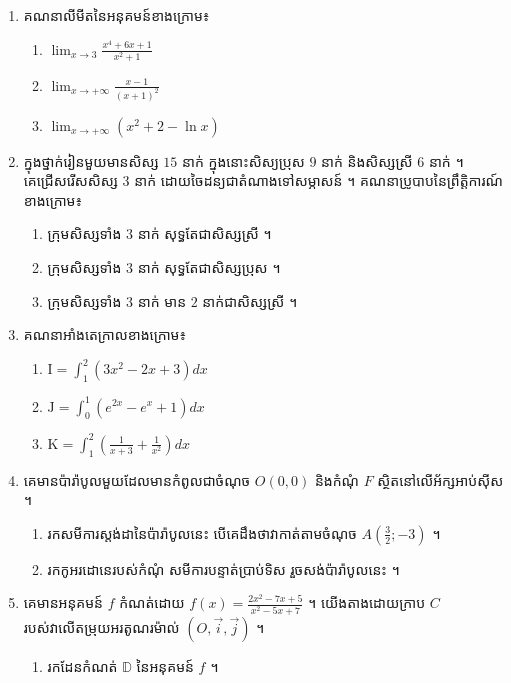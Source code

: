 \documentclass{officialexam}
\begin{document}
  \begin{enumerate}[I]
  	\item គណនាលីមីតនៃអនុគមន៍ខាងក្រោម៖
  	\begin{enumerate}[k,3]
  		\item $\lim_{x\to3}\frac{x^4+6x+1}{x^2+1}$
  		\item $\lim_{x\to+\infty}\frac{x-1}{\left(x+1\right)^2}$
  		\item $\lim_{x\to+\infty}\left(x^2+2-\ln x\right)$
  	\end{enumerate}
  	\item ក្នុងថ្នាក់រៀនមួយមានសិស្ស $15$ នាក់ ក្នុងនោះសិស្យប្រុស $9$ នាក់ និងសិស្សស្រី $6$ នាក់ ។ \\ 
  	គេជ្រើសរើសសិស្ស $3$ នាក់ ដោយចៃដន្យជាតំណាងទៅសម្ភាសន៍ ។ គណនាប្រូបាបនៃព្រឹត្តិការណ៍ខាងក្រោម៖
  	\begin{enumerate}[A]
  		\item ក្រុមសិស្សទាំង $3$ នាក់ សុទ្ធតែជាសិស្សស្រី ។
  		\item ក្រុមសិស្សទាំង $3$ នាក់ សុទ្ធតែជាសិស្សប្រុស ។
  		\item ក្រុមសិស្សទាំង $3$ នាក់ មាន $2$ នាក់ជាសិស្សស្រី ។
  	\end{enumerate}
  	\item គណនាអាំងតេក្រាលខាងក្រោម៖ 
  	\begin{enumerate}[k,3]
  		\item $\mathrm{I}=\int_{1}^{2}\left(3x^2-2x+3\right)dx$
  		\item $\mathrm{J}=\int_{0}^{1}\left(e^{2x}-e^x+1\right)dx$
  		\item $\mathrm{K}=\int_{1}^{2}\left(\frac{1}{x+3}+\frac{1}{x^2}\right)dx$
  	\end{enumerate}
  	\item គេមានប៉ារ៉ាបូលមួយដែលមានកំពូលជាចំណុច $O\left(0,0\right)$ និងកំណុំ $F$ ស្ថិតនៅលើអ័ក្សអាប់ស៊ីស ។
  	\begin{enumerate}[k]
  		\item រកសមីការស្តង់ដានៃប៉ារ៉ាបូលនេះ បើគេដឹងថាវាកាត់តាមចំណុច $A\left(\frac{3}{2};-3\right)$ ។
  		\item រកកូអរដោនេរបស់កំណុំ សមីការបន្ទាត់ប្រាប់ទិស រួចសង់ប៉ារ៉ាបូលនេះ ។
  	\end{enumerate}
  	\item គេមានអនុគមន៍ $f$ កំណត់ដោយ $f(x)=\frac{2x^2-7x+5}{x^2-5x+7}$ ។ យើងតាងដោយក្រាប $C$ របស់វាលើតម្រុយអរតូណរម៉ាល់ $\left(O, \vec{i}, \vec{j}\right)$ ។
  	\begin{enumerate}[1]
  		\item រកដែនកំណត់ $\mathbb{D}$ នៃអនុគមន៍ $f$ ។

\end{enumerate}
\end{enumerate}
\end{document}
